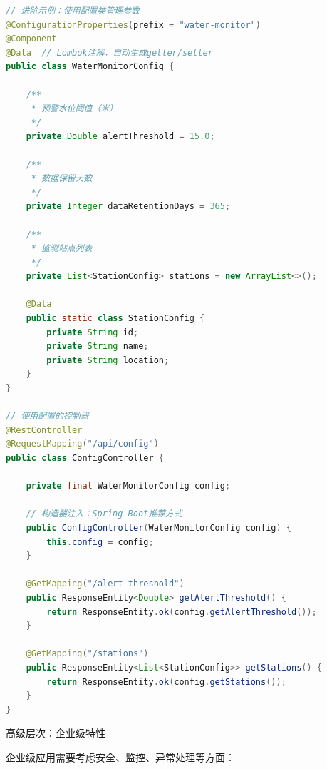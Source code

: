 \begin{lstlisting}[language=Java]
// 进阶示例：使用配置类管理参数
@ConfigurationProperties(prefix = "water-monitor")
@Component
@Data  // Lombok注解，自动生成getter/setter
public class WaterMonitorConfig {
    
    /**
     * 预警水位阈值（米）
     */
    private Double alertThreshold = 15.0;
    
    /**
     * 数据保留天数
     */
    private Integer dataRetentionDays = 365;
    
    /**
     * 监测站点列表
     */
    private List<StationConfig> stations = new ArrayList<>();
    
    @Data
    public static class StationConfig {
        private String id;
        private String name;
        private String location;
    }
}

// 使用配置的控制器
@RestController
@RequestMapping("/api/config")
public class ConfigController {
    
    private final WaterMonitorConfig config;
    
    // 构造器注入：Spring Boot推荐方式
    public ConfigController(WaterMonitorConfig config) {
        this.config = config;
    }
    
    @GetMapping("/alert-threshold")
    public ResponseEntity<Double> getAlertThreshold() {
        return ResponseEntity.ok(config.getAlertThreshold());
    }
    
    @GetMapping("/stations")
    public ResponseEntity<List<StationConfig>> getStations() {
        return ResponseEntity.ok(config.getStations());
    }
}
\end{lstlisting}

 高级层次：企业级特性

企业级应用需要考虑安全、监控、异常处理等方面：

